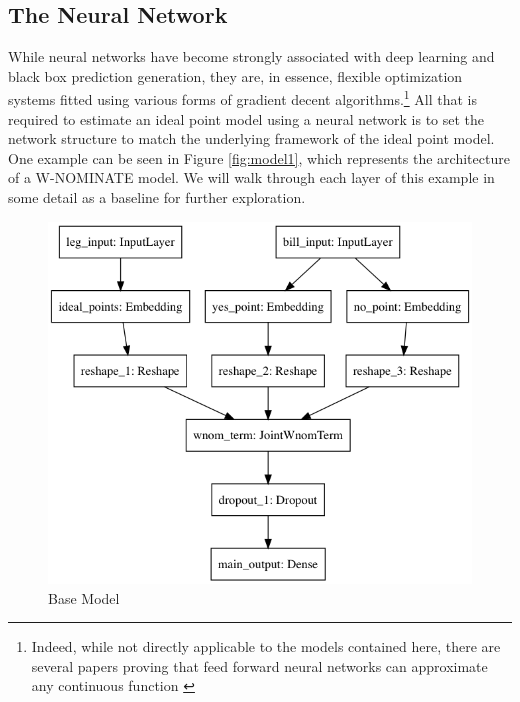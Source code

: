\documentclass[11pt,]{article}
\begin{document}
\subsection{The Neural Network}\label{the-neural-network}

While neural networks have become strongly associated with deep learning
and black box prediction generation, they are, in essence, flexible
optimization systems fitted using various forms of gradient decent
algorithms.\footnote{Indeed, while not directly applicable to the models
  contained here, there are several papers proving that feed forward
  neural networks can approximate any continuous function
  \citep{cybenko1989approximation, hornik1991}} All that is required to
estimate an ideal point model using a neural network is to set the
network structure to match the underlying framework of the ideal point
model. One example can be seen in Figure \ref{fig:model1}, which
represents the architecture of a W-NOMINATE model. We will walk through
each layer of this example in some detail as a baseline for further
exploration.

\begin{figure}

{\centering \includegraphics[width=0.75\linewidth]{model}

}

\caption{\label{fig:model1}Base Model}\label{fig:unnamed-chunk-3}
\end{figure}
\end{document}

